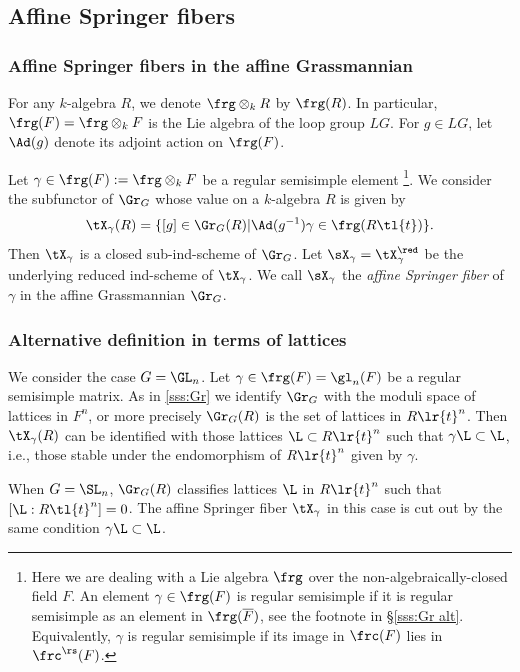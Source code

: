 \subsection{Affine Springer fibers} 

\subsubsection{Affine Springer fibers in the affine Grassmannian} For any $k$-algebra $R$, we denote $\frg\otimes_{k}R$ by $\frg(R)$. In particular, $\frg(F)=\frg\otimes_{k}F$ is the Lie algebra of the loop group $LG$. For $g\in LG$, let $\Ad(g)$ denote its adjoint action on $\frg(F)$. 

Let $\gamma\in\frg(F):=\frg\otimes_{k}F$ be a regular semisimple element \footnote{Here we are dealing with a Lie algebra $\frg$ over the non-algebraically-closed field $F$. An element  $\gamma\in\frg(F)$ is regular semisimple if it is regular semisimple as an element in $\frg(\overline{F})$, see the footnote in \S\ref{sss:Gr alt}. Equivalently, $\gamma$ is regular semisimple if its image in $\frc(F)$ lies in $\frc^{\rs}(F)$.}.  We consider the subfunctor of $\Gr_{G}$ whose value on a $k$-algebra $R$ is given by 
\begin{equation}\label{aff Spr}
\tX_{\gamma}(R)=\{[g]\in \Gr_{G}(R)|\Ad(g^{-1})\gamma\in\frg(R\tl{t})\}.
\end{equation} 
Then $\tX_{\gamma}$ is a closed sub-ind-scheme of $\Gr_{G}$. Let $\sX_{\gamma}=\tX^{\red}_{\gamma}$ be the underlying reduced ind-scheme of $\tX_{\gamma}$. We call $\sX_{\gamma}$ the {\em affine Springer fiber} of $\gamma$ in the affine Grassmannian $\Gr_{G}$.

\subsubsection{Alternative definition in terms of lattices}\label{sss:ASF Gr GLn} We consider the case $G=\GL_{n}$. Let $\gamma\in\frg(F)=\gl_{n}(F)$ be a regular semisimple matrix. As in \ref{sss:Gr} we identify $\Gr_{G}$ with the moduli space of lattices in $F^{n}$, or more precisely $\Gr_{G}(R)$ is the set of lattices in $R\lr{t}^{n}$. Then $\tX_{\gamma}(R)$ can be identified with those lattices $\L\subset R\lr{t}^{n}$ such that $\gamma \L\subset \L$, i.e., those stable under the endomorphism of $R\lr{t}^{n}$ given by $\gamma$. 

When $G=\SL_{n}$, $\Gr_{G}(R)$ classifies lattices $\L$ in $R\lr{t}^{n}$ such that $[\L:R\tl{t}^{n}]=0$. The affine Springer fiber $\tX_{\gamma}$ in this case is cut out by the same condition $\gamma \L\subset \L$.

